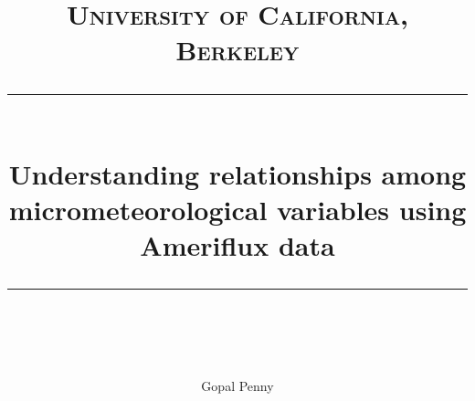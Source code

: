 %
%
\usepackage[english]{babel}
\usepackage{graphicx}
\usepackage{epstopdf}
\usepackage{fullpage}
\usepackage{natbib}
\usepackage{amsmath}
\usepackage{lineno}
\usepackage{longtable}
\usepackage{multirow}
\usepackage{lscape}
\usepackage{rotating}
\usepackage{url}
\linespread{1}
\usepackage[T1]{fontenc}
\usepackage{mathptmx}
\usepackage{multicol}
\usepackage{amsfonts}
\usepackage{listings}
\usepackage[usenames,dvipsnames]{color}
\usepackage{float}



\newcommand{\FIX}[1]{{\color{magenta} [{\bfseries #1}] }}
\newcommand{\NEW}[1]{{\color{green} #1 }}

\newcommand{\horrule}[1]{\rule{\linewidth}{#1}} %

\title{	
\normalfont \normalsize 
\textsc{University of California, Berkeley} \\ [25pt] %
\horrule{0.5pt} \\[0.2cm] %
\huge Understanding relationships among micrometeorological variables using Ameriflux data \\ %
\horrule{0.5pt} \\[0.1cm] %
}

\author{Gopal Penny}


\maketitle


\thispagestyle{empty}


\normalsize

%
%
%
%
